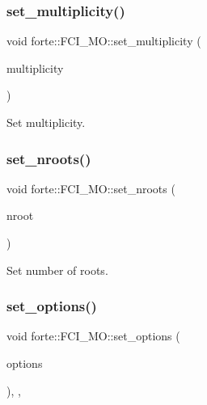 \subsubsection{\texorpdfstring{set\+\_\+multiplicity()}{set\_multiplicity()}}
{\footnotesize\ttfamily void forte\+::\+F\+C\+I\+\_\+\+M\+O\+::set\+\_\+multiplicity (\begin{DoxyParamCaption}\item[{int}]{multiplicity }\end{DoxyParamCaption})\hspace{0.3cm}{\ttfamily [inline]}}



Set multiplicity. 

\mbox{\label{classforte_1_1_f_c_i___m_o_a55d56c1d9ef438ff82a7b02dd5050bf1}} 
\subsubsection{\texorpdfstring{set\+\_\+nroots()}{set\_nroots()}}
{\footnotesize\ttfamily void forte\+::\+F\+C\+I\+\_\+\+M\+O\+::set\+\_\+nroots (\begin{DoxyParamCaption}\item[{int}]{nroot }\end{DoxyParamCaption})\hspace{0.3cm}{\ttfamily [inline]}}



Set number of roots. 

\mbox{\label{classforte_1_1_f_c_i___m_o_ad03e24facf8d8b4ba766ce7a0e5725e6}} 
\subsubsection{\texorpdfstring{set\+\_\+options()}{set\_options()}}
{\footnotesize\ttfamily void forte\+::\+F\+C\+I\+\_\+\+M\+O\+::set\+\_\+options (\begin{DoxyParamCaption}\item[{std\+::shared\+\_\+ptr$<$ \mbox{\hyperlink{classforte_1_1_forte_options}{Forte\+Options}} $>$}]{options }\end{DoxyParamCaption})\hspace{0.3cm}{\ttfamily [inline]}, {\ttfamily [override]}, {\ttfamily [virtual]}}

